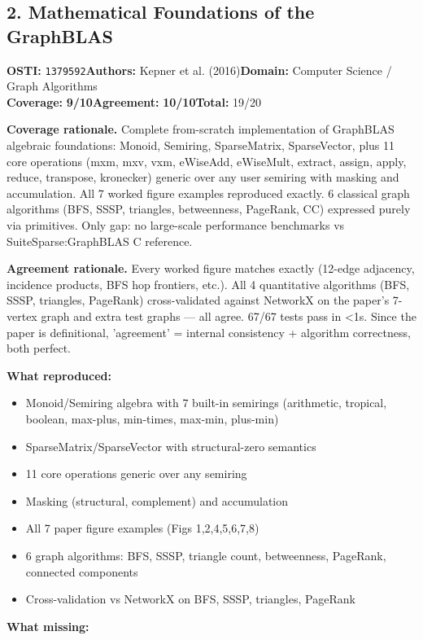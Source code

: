 \documentclass[11pt]{article}
\newcommand{\scorebadge}[2]{\textbf{#1:} \textbf{#2/10}}
\begin{document}
\subsection{2. Mathematical Foundations of the GraphBLAS}
\textbf{OSTI:} \texttt{1379592}\quad\textbf{Authors:} Kepner et al. (2016)\quad\textbf{Domain:} Computer Science / Graph Algorithms\\
\scorebadge{Coverage}{9}\quad\scorebadge{Agreement}{10}\quad\textbf{Total:} 19/20\par\smallskip
\noindent\textbf{Coverage rationale.} Complete from-scratch implementation of GraphBLAS algebraic foundations: Monoid, Semiring, SparseMatrix, SparseVector, plus 11 core operations (mxm, mxv, vxm, eWiseAdd, eWiseMult, extract, assign, apply, reduce, transpose, kronecker) generic over any user semiring with masking and accumulation. All 7 worked figure examples reproduced exactly. 6 classical graph algorithms (BFS, SSSP, triangles, betweenness, PageRank, CC) expressed purely via primitives. Only gap: no large-scale performance benchmarks vs SuiteSparse:GraphBLAS C reference.\par
\noindent\textbf{Agreement rationale.} Every worked figure matches exactly (12-edge adjacency, incidence products, BFS hop frontiers, etc.). All 4 quantitative algorithms (BFS, SSSP, triangles, PageRank) cross-validated against NetworkX on the paper's 7-vertex graph and extra test graphs --- all agree. 67/67 tests pass in \textless{}1s. Since the paper is definitional, 'agreement' = internal consistency + algorithm correctness, both perfect.\par\smallskip
\noindent\textbf{What reproduced:}
\begin{itemize}[leftmargin=1.4em,itemsep=0.2em,topsep=0.2em]
\item Monoid/Semiring algebra with 7 built-in semirings (arithmetic, tropical, boolean, max-plus, min-times, max-min, plus-min)
\item SparseMatrix/SparseVector with structural-zero semantics
\item 11 core operations generic over any semiring
\item Masking (structural, complement) and accumulation
\item All 7 paper figure examples (Figs 1,2,4,5,6,7,8)
\item 6 graph algorithms: BFS, SSSP, triangle count, betweenness, PageRank, connected components
\item Cross-validation vs NetworkX on BFS, SSSP, triangles, PageRank
\end{itemize}\noindent\textbf{What missing:}
\end{document}

